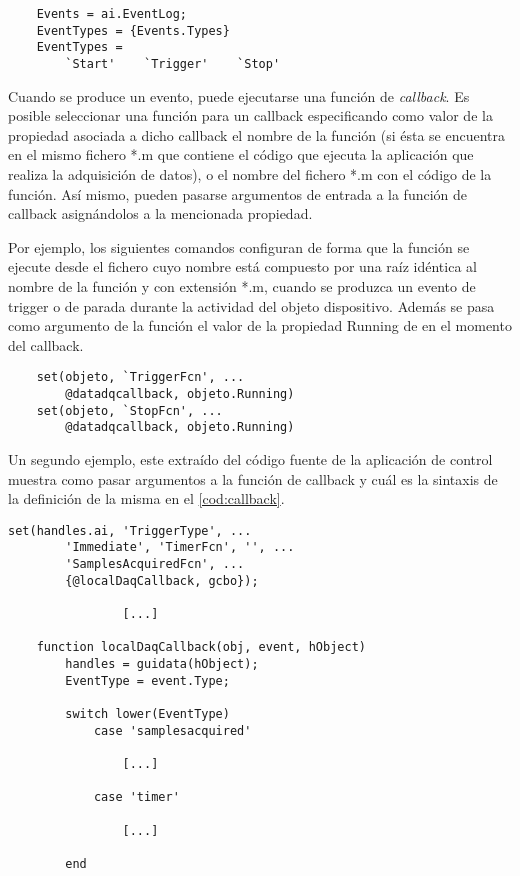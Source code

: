 \begin{lstlisting}
	Events = ai.EventLog;
	EventTypes = {Events.Types}
	EventTypes =
		`Start'    `Trigger'	`Stop'
\end{lstlisting}

Cuando se produce un evento, puede ejecutarse una función de
\emph{callback}. Es posible seleccionar una función para un callback
especificando como valor de la propiedad asociada a dicho callback el
nombre de la función (si ésta se encuentra en el mismo fichero *.m que
contiene el código que ejecuta la aplicación que realiza la adquisición de
datos), o el nombre del fichero *.m con el código de la función. Así mismo,
pueden pasarse argumentos de entrada a la función de callback asignándolos
a la mencionada propiedad.

Por ejemplo, los siguientes comandos configuran  de forma que
la función  se ejecute desde el fichero cuyo nombre
está compuesto por una raíz idéntica al nombre de la función y con
extensión *.m, cuando se produzca un evento de trigger o de parada durante
la actividad del objeto dispositivo. Además se pasa como argumento de la
función el valor de la propiedad \textsf{Running} de  en el
momento del callback.

\begin{lstlisting}
	set(objeto, `TriggerFcn', ...
		@datadqcallback, objeto.Running)
	set(objeto, `StopFcn', ...
		@datadqcallback, objeto.Running)
\end{lstlisting}

Un segundo ejemplo, este extraído del código fuente de la aplicación de
control muestra como pasar argumentos a la función de callback y cuál es la
sintaxis de la definición de la misma en el \cref{cod:callback}.

\begin{lstlisting}[style=displayed, caption={[Configuración de
	\emph{callback}]{Configuración de \emph{callback} para responder a
	eventos en la sesión de muestreo, la función de \emph{callback}
	recibe un argumento.}}, label={cod:callback}]
	set(handles.ai, 'TriggerType', ...
		'Immediate', 'TimerFcn', '', ...
		'SamplesAcquiredFcn', ...
		{@localDaqCallback, gcbo});

				[...]

	function localDaqCallback(obj, event, hObject)
		handles = guidata(hObject);
		EventType = event.Type;

		switch lower(EventType)
			case 'samplesacquired'

				[...]

			case 'timer'

				[...]

		end
\end{lstlisting}

